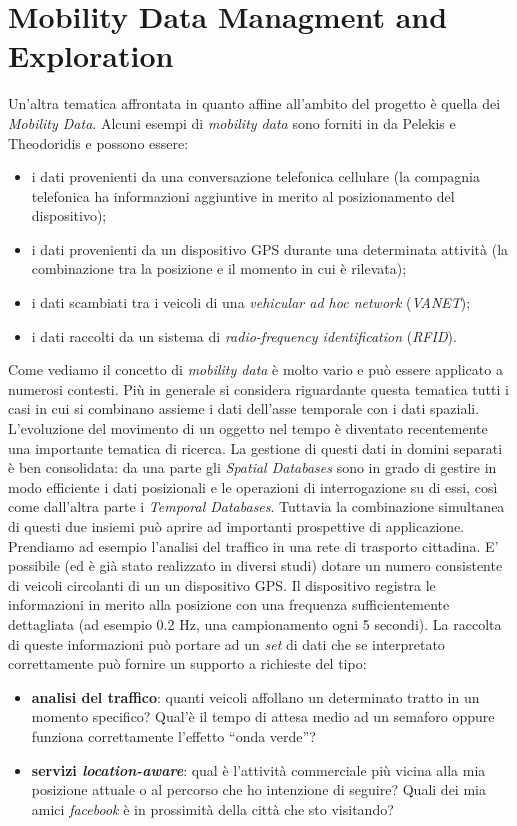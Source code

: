 \documentclass[a4paper, 12pt, twoside, openright]{book}
\begin{document}
\section{Mobility Data Managment and Exploration}
Un'altra tematica affrontata in quanto affine all'ambito del progetto è quella dei \emph{Mobility Data}. Alcuni esempi di \emph{mobility data} sono forniti in \cite{mdme} da Pelekis e Theodoridis e possono essere:
\begin{itemize}
  \item i dati provenienti da una conversazione telefonica cellulare (la compagnia telefonica ha informazioni aggiuntive in merito al posizionamento del dispositivo);
  \item i dati provenienti da un dispositivo GPS durante una determinata attività (la combinazione tra la posizione e il momento in cui è rilevata);
  \item i dati scambiati tra i veicoli di una \emph{vehicular ad hoc network} (\emph{VANET});
  \item i dati raccolti da un sistema di \emph{radio-frequency identification} (\emph{RFID}).
\end{itemize}
Come vediamo il concetto di \emph{mobility data} è molto vario e può essere applicato a numerosi contesti. Più in generale si considera riguardante questa tematica tutti i casi in cui si combinano assieme i dati dell'asse temporale con i dati spaziali. L'evoluzione del movimento di un oggetto nel tempo è diventato recentemente una importante tematica di ricerca. La gestione di questi dati in domini separati è ben consolidata: da una parte gli \emph{Spatial Databases} sono in grado di gestire in modo efficiente i dati posizionali e le operazioni di interrogazione su di essi, così come dall'altra parte i \emph{Temporal Databases}. Tuttavia la combinazione simultanea di questi due insiemi può aprire ad importanti prospettive di applicazione. Prendiamo ad esempio l'analisi del traffico in una rete di trasporto cittadina. E' possibile (ed è già stato realizzato in diversi studi) dotare un numero consistente di veicoli circolanti di un un dispositivo GPS. Il dispositivo registra le informazioni in merito alla posizione con una frequenza sufficientemente dettagliata (ad esempio 0.2 Hz, una campionamento ogni 5 secondi). La raccolta di queste informazioni può portare ad un \emph{set} di dati che se interpretato correttamente può fornire un supporto a richieste del tipo:
\begin{itemize}
  \item \textbf{analisi del traffico}: quanti veicoli affollano un determinato tratto in un momento specifico? Qual'è il tempo di attesa medio ad un semaforo oppure funziona correttamente l'effetto ``onda verde''?
  \item \textbf{servizi \emph{location-aware}}: qual è l'attività commerciale più vicina alla mia posizione attuale o al percorso che ho intenzione di seguire? Quali dei mia amici \emph{facebook} è in prossimità della città che sto visitando?
\end{itemize}
\end{document}
